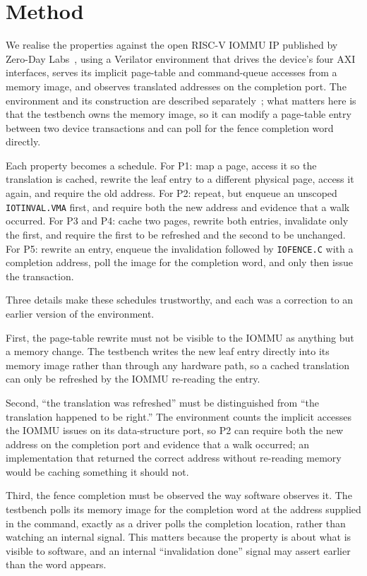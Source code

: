 \documentclass[journal]{IEEEtran}
\newcommand{\cmd}[1]{\mbox{\texttt{#1}}}
\begin{document}
\section{Method}
We realise the properties against the open RISC-V IOMMU IP published by
Zero-Day Labs~\cite{rviommu}, using a Verilator environment that drives the
device's four AXI interfaces, serves its implicit page-table and command-queue
accesses from a memory image, and observes translated addresses on the
completion port. The environment and its construction are described
separately~\cite{companion}; what matters here is that the testbench owns the
memory image, so it can modify a page-table entry between two device
transactions and can poll for the fence completion word directly.

Each property becomes a schedule. For P1: map a page, access it so the
translation is cached, rewrite the leaf entry to a different physical page,
access it again, and require the old address. For P2: repeat, but enqueue an
unscoped \cmd{IOTINVAL.VMA} first, and require both the new address and
evidence that a walk occurred. For P3 and P4: cache two pages, rewrite both
entries, invalidate only the first, and require the first to be refreshed and the
second to be unchanged. For P5: rewrite an entry, enqueue the invalidation
followed by \cmd{IOFENCE.C} with a completion address, poll the image for the
completion word, and only then issue the transaction.

Three details make these schedules trustworthy, and each was a correction to an
earlier version of the environment.

First, the page-table rewrite must not be visible to the IOMMU as anything but a
memory change. The testbench writes the new leaf entry directly into its memory
image rather than through any hardware path, so a cached translation can only be
refreshed by the IOMMU re-reading the entry.

Second, ``the translation was refreshed'' must be distinguished from ``the
translation happened to be right.'' The environment counts the implicit accesses
the IOMMU issues on its data-structure port, so P2 can require both the new
address on the completion port and evidence that a walk occurred; an
implementation that returned the correct address without re-reading memory would
be caching something it should not.

Third, the fence completion must be observed the way software observes it. The
testbench polls its memory image for the completion word at the address supplied
in the command, exactly as a driver polls the completion location, rather than
watching an internal signal. This matters because the property is about what is
visible to software, and an internal ``invalidation done'' signal may assert
earlier than the word appears.
\end{document}
